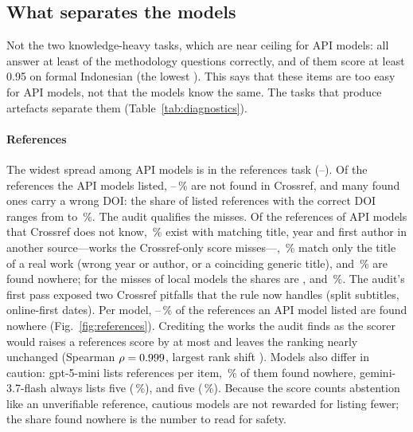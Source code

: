 \subsection{What separates the models}
\label{sec:separates}


Not the two knowledge-heavy tasks, which are near ceiling for API models: all \NApi{} answer at least \MethApiMin{} of the methodology questions correctly, and \LangCeil{} of them score at least 0.95 on formal Indonesian (the lowest \LangApiMin{}). This says that these items are too easy for API models, not that the models know the same. The tasks that produce artefacts separate them (Table~\ref{tab:diagnostics}).

\paragraph{References} The widest spread among API models is in the references task (\RefApiMin{}--\RefApiMax{}). Of the references the API models listed, \HalApiMin{}--\HalApiMax{}\,\% are not found in Crossref, and many found ones carry a wrong DOI: the share of listed references with the correct DOI ranges from \DoiApiMin{} to \DoiApiMax{}\,\%. The audit qualifies the misses. Of the \AuditApiNF{} references of API models that Crossref does not know, \AuditApiExact{}\,\% exist with matching title, year and first author in another source---works the Crossref-only score misses---, \AuditApiTitle{}\,\% match only the title of a real work (wrong year or author, or a coinciding generic title), and \AuditApiNone{}\,\% are found nowhere; for the \AuditLocNF{} misses of local models the shares are \AuditLocExact{}, \AuditLocTitle{} and \AuditLocNone{}\,\%. The audit's first pass exposed two Crossref pitfalls that the rule now handles (split subtitles, online-first dates). Per model, \NoneApiMin{}--\NoneApiMax{}\,\% of the references an API model listed are found nowhere (Fig.~\ref{fig:references}). Crediting the works the audit finds as the scorer would raises a references score by at most \VerRefMaxGain{} and leaves the ranking nearly unchanged (Spearman $\rho=0.999{}$, largest rank shift \VerMaxShift{}). Models also differ in caution: gpt-5-mini lists \RefsGptFiveMini{} references per item, \NoneGptFiveMini{}\,\% of them found nowhere, gemini-3.7-flash always lists five (\NoneGeminiThreeSevenFlash{}\,\%), and \TopName{} five (\NoneKimiKThree{}\,\%). Because the score counts abstention like an unverifiable reference, cautious models are not rewarded for listing fewer; the share found nowhere is the number to read for safety.

